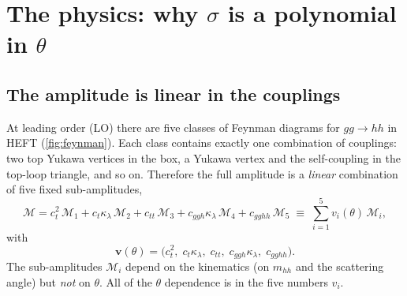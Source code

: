 \documentclass[11pt]{article}
\newcommand{\mhh}{m_{hh}}
\newcommand{\kl}{\kappa_\lambda}
\newcommand{\ct}{c_t}
\newcommand{\ctt}{c_{tt}}
\newcommand{\cggh}{c_{ggh}}
\newcommand{\cgghh}{c_{gghh}}
\newcommand{\bv}{\boldsymbol{v}}
\begin{document}
\section{The physics: why $\sigma$ is a polynomial in $\theta$}
\label{sec:physics}

\subsection{The amplitude is linear in the couplings}

At leading order (LO) there are five classes of Feynman diagrams for
$gg\to hh$ in HEFT (\cref{fig:feynman}). Each class contains exactly one
combination of couplings: two top Yukawa vertices in the box, a Yukawa vertex
and the self-coupling in the top-loop triangle, and so on. Therefore the full
amplitude is a \emph{linear} combination of five fixed sub-amplitudes,
\begin{equation}
  \mathcal{M} = \ct^2\,\mathcal{M}_1 + \ct\kl\,\mathcal{M}_2 + \ctt\,\mathcal{M}_3
  + \cggh\kl\,\mathcal{M}_4 + \cgghh\,\mathcal{M}_5
  \;\equiv\; \sum_{i=1}^{5} v_i(\theta)\,\mathcal{M}_i ,
  \label{eq:amp}
\end{equation}
with
\begin{equation}
  \bv(\theta) = \big(\ct^2,\; \ct\kl,\; \ctt,\; \cggh\kl,\; \cgghh\big).
  \label{eq:v}
\end{equation}
The sub-amplitudes $\mathcal{M}_i$ depend on the kinematics (on $\mhh$ and the
scattering angle) but \emph{not} on $\theta$. All of the $\theta$ dependence is in the
five numbers $v_i$.
\end{document}
